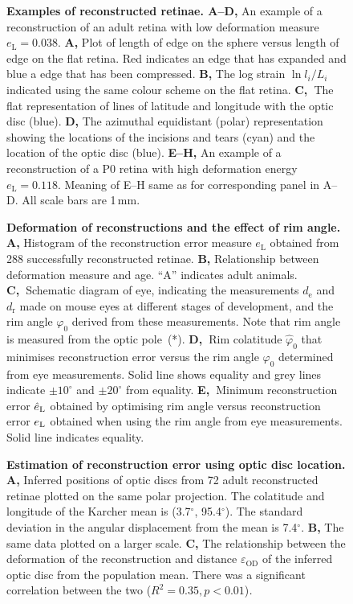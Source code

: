 \documentclass[10pt]{article}
\begin{document}
\begin{figure}[!ht]\caption{
\textbf{Examples of reconstructed retinae. A--D,} An example
of a reconstruction of an adult retina with low deformation measure
$e_\mathrm{L}=0.038$. \textbf{A,} Plot of length of edge
on the sphere versus length of edge on the flat retina. Red indicates
an edge that has expanded and blue a edge that has been compressed.
\textbf{B,} The log strain  $\ln l_i/L_i$ indicated using the
same colour scheme on the flat retina. \textbf{C,}\textbf{~}The flat
representation of lines of latitude and longitude with the optic disc
(blue). \textbf{D,} The azimuthal equidistant (polar) representation
showing the locations of the incisions and tears (cyan) and the
location of the optic disc (blue). \textbf{E--H,} An example of a
reconstruction of a P0 retina with high deformation energy
$e_\mathrm{L}=0.118$. Meaning of E--H same as for
corresponding panel in A--D. All scale bars are 1\,mm.
}\end{figure}

\begin{figure}[!ht]\caption{
\textbf{Deformation of reconstructions and the effect of rim
angle. A,} Histogram of the reconstruction error measure
$e_\mathrm{L}$ obtained from 288 successfully
reconstructed retinae.  \textbf{B,} Relationship between deformation
measure and age. ``A'' indicates adult animals.
\textbf{C,}\textbf{~}Schematic diagram of eye, indicating the
measurements   $d_{\mathrm{e}}$ and  $d_{\mathrm{r}}$ made on mouse eyes at different
stages of development, and the rim angle  $\varphi _0$ derived from
these measurements. Note that rim angle is measured from the optic
pole~(*). \textbf{D,}\textbf{~}Rim colatitude  $\hat{\varphi }_0$
that minimises reconstruction error  versus the rim angle  $\varphi
_0$ determined  from eye measurements. Solid line shows equality and
grey lines indicate  $\pm 10^{\circ }$ and  $\pm 20^{\circ }$ from
equality. \textbf{E,}\textbf{~}Minimum reconstruction error  $\hat
e_{\text L}$ obtained by optimising rim angle versus reconstruction
error  $e_{\text L}$ obtained when using the rim angle from eye
measurements. Solid line indicates equality.
}\end{figure}

\begin{figure}[!ht]\caption{
\textbf{}\textbf{Estimation of reconstruction error using
optic disc location. }\textbf{A,} Inferred positions of optic discs
from 72 adult reconstructed retinae plotted on the same polar
projection. The colatitude and longitude of the Karcher mean is
(3.7$^{\circ}$, 95.4$^{\circ}$). The standard deviation in the angular
displacement from the mean is  7.4$^{\circ}$. \textbf{B,} The same data
plotted on a larger scale. \textbf{C, }The relationship between the
deformation of the reconstruction and distance  $\varepsilon
_{\text{OD}}$  of the inferred optic disc from the population mean.
There was a significant correlation between the two ($R^2=0.35,p<0.01$)\textit{.}
}\end{figure}
\end{document}
